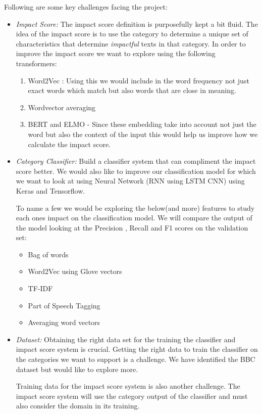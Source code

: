 \documentclass{article}
\begin{document}
Following are some key challenges facing the project:
\begin{itemize}
	\item \textit{Impact Score:}
	The impact score definition is purposefully kept a bit fluid. The idea of the impact score is to use the category to determine a unique set of characteristics that determine \textit{impactful} texts in that category. In order to improve the impact score we want to explore using the following transformers: 

	\begin{enumerate}
		\item Word2Vec : Using this we would include in the word frequency not just exact words which match but also words that are close in meaning. 
		\item Wordvector averaging 
		\item BERT and ELMO - Since these embedding take into account not just the word but also the context of the input this would help us improve how we calculate the impact score. 
	\end{enumerate}
	
	\item \textit{Category Classifier:} 
	Build a classifier system that can compliment the impact score better. We would also like to improve our classification model for which we want to look at using Neural Network (RNN using LSTM CNN) using Keras and Tensorflow. 
	
	To name a few we would be exploring the below(and more) features to study each ones impact on the classification model. We will compare the output of the model looking at the  Precision , Recall and F1 scores on the validation set: 
	
	\begin{itemize}
		\item Bag of words 
		\item Word2Vec using Glove vectors
		\item TF-IDF
		\item Part of Speech Tagging
		\item Averaging word vectors 
	\end{itemize}

	\item \textit{Dataset:}
	Obtaining the right data set for the training the classifier and impact score system is crucial. Getting the right data to train the classifier on the categories we want to support is a challenge. We have identified the BBC dataset but would like to explore more.
	 
	 Training data for the impact score system is also another challenge. The impact score system will use the category output of the classifier and must also consider the domain in its training. 
	 
\end{itemize}
\end{document}
